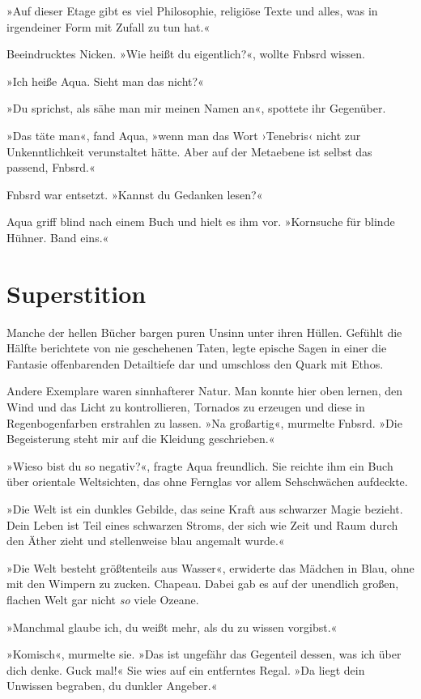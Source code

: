 »Auf dieser Etage gibt es viel Philosophie, religiöse Texte und alles, was in irgendeiner Form mit Zufall zu tun hat.«

Beeindrucktes Nicken. »Wie heißt du eigentlich?«, wollte Fnbsrd wissen.

»Ich heiße Aqua. Sieht man das nicht?«

»Du sprichst, als sähe man mir meinen Namen an«, spottete ihr Gegenüber.

»Das täte man«, fand Aqua, »wenn man das Wort ›Tenebris‹ nicht zur Unkenntlichkeit verunstaltet hätte. Aber auf der Metaebene ist selbst das passend, Fnbsrd.«

Fnbsrd war entsetzt. »Kannst du Gedanken lesen?«

Aqua griff blind nach einem Buch und hielt es ihm vor. »Kornsuche für blinde Hühner. Band eins.«


\chapter{Superstition}

Manche der hellen Bücher bargen puren Unsinn unter ihren Hüllen. Gefühlt die Hälfte berichtete von nie geschehenen Taten, legte epische Sagen in einer die Fantasie offenbarenden Detailtiefe dar und umschloss den Quark mit Ethos.

Andere Exemplare waren sinnhafterer Natur. Man konnte hier oben lernen, den Wind und das Licht zu kontrollieren, Tornados zu erzeugen und diese in Regenbogenfarben erstrahlen zu lassen. »Na großartig«, murmelte Fnbsrd. »Die Begeisterung steht mir auf die Kleidung geschrieben.«

»Wieso bist du so negativ?«, fragte Aqua freundlich. Sie reichte ihm ein Buch über orientale Weltsichten, das ohne Fernglas vor allem Sehschwächen aufdeckte.

»Die Welt ist ein dunkles Gebilde, das seine Kraft aus schwarzer Magie bezieht. Dein Leben ist Teil eines schwarzen Stroms, der sich wie Zeit und Raum durch den Äther zieht und stellenweise blau angemalt wurde.«

»Die Welt besteht größtenteils aus Wasser«, erwiderte das Mädchen in Blau, ohne mit den Wimpern zu zucken. Chapeau. Dabei gab es auf der unendlich großen, flachen Welt gar nicht \emph{so} viele Ozeane.

»Manchmal glaube ich, du weißt mehr, als du zu wissen vorgibst.«

»Komisch«, murmelte sie. »Das ist ungefähr das Gegenteil dessen, was ich über dich denke. Guck mal!« Sie wies auf ein entferntes Regal. »Da liegt dein Unwissen begraben, du dunkler Angeber.«

